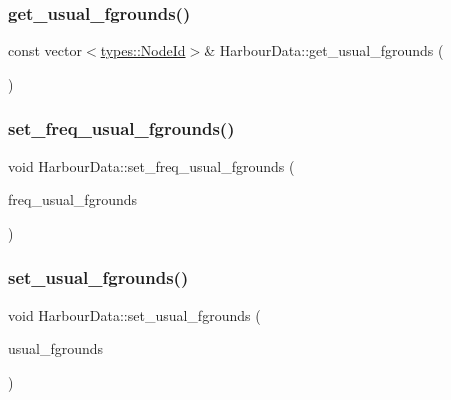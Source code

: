 \mbox{\label{class_harbour_data_a585ad4e0d5323b8454656cfa0351dcab}} 
\subsubsection{\texorpdfstring{get\_usual\_fgrounds()}{get\_usual\_fgrounds()}}
{\footnotesize\ttfamily const vector$<$\mbox{\hyperlink{classtypes_1_1_node_id}{types\+::\+Node\+Id}}$>$\& Harbour\+Data\+::get\+\_\+usual\+\_\+fgrounds (\begin{DoxyParamCaption}{ }\end{DoxyParamCaption})\hspace{0.3cm}{\ttfamily [inline]}}

\mbox{\label{class_harbour_data_a16e99d5d14c4478b48be1ef89e790525}} 
\subsubsection{\texorpdfstring{set\_freq\_usual\_fgrounds()}{set\_freq\_usual\_fgrounds()}}
{\footnotesize\ttfamily void Harbour\+Data\+::set\+\_\+freq\+\_\+usual\+\_\+fgrounds (\begin{DoxyParamCaption}\item[{vector$<$ double $>$}]{freq\+\_\+usual\+\_\+fgrounds }\end{DoxyParamCaption})\hspace{0.3cm}{\ttfamily [inline]}}

\mbox{\label{class_harbour_data_aa31a224969f9a21d3f3dc4680568097e}} 
\subsubsection{\texorpdfstring{set\_usual\_fgrounds()}{set\_usual\_fgrounds()}}
{\footnotesize\ttfamily void Harbour\+Data\+::set\+\_\+usual\+\_\+fgrounds (\begin{DoxyParamCaption}\item[{const vector$<$ \mbox{\hyperlink{classtypes_1_1_node_id}{types\+::\+Node\+Id}} $>$ \&}]{usual\+\_\+fgrounds }\end{DoxyParamCaption})\hspace{0.3cm}{\ttfamily [inline]}}



